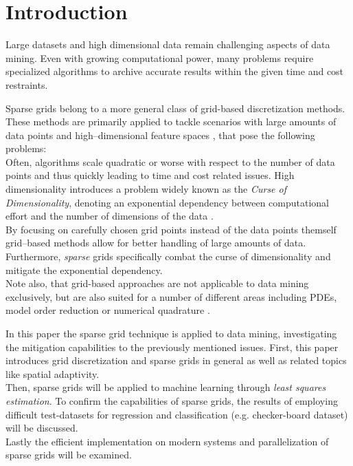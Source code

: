 \section{Introduction}
Large datasets and high dimensional data remain challenging aspects of data
mining. Even with growing computational power, many problems require
specialized algorithms to archive accurate results within the given time and
cost restraints.

\par

Sparse grids belong to a more general class of grid-based
discretization methods. These methods are primarily applied to
tackle scenarios with large amounts of data points and high--dimensional
feature spaces \cite{artbunshort}, that pose the following problems:
\\
Often, algorithms scale quadratic or worse with respect to the number of data points and
thus quickly leading to time and cost related issues.
High dimensionality introduces a problem widely known as the \emph{Curse of
Dimensionality}, denoting an exponential dependency between computational
effort and the number of dimensions of the data \cite{artbunshort, disspfl}. \\
By focusing on carefully chosen grid points instead
of the data points themself grid--based methods allow for better handling of large amounts of data. 
Furthermore, \emph{sparse} grids specifically combat the curse of 
dimensionality and mitigate the exponential dependency. \\
Note also, that grid-based approaches are not applicable to data mining
exclusively, but are also
suited for a number of different areas including PDEs, model order
reduction \cite{disspeh} or numerical quadrature \cite{artbunlong}.

\par

In this paper the sparse grid technique is applied to data mining,
investigating the mitigation capabilities to the previously mentioned issues.
First, this paper introduces grid discretization and sparse grids in
general as well as related topics like spatial adaptivity. \\
Then, sparse grids will be applied to machine learning
through \emph{least squares estimation}. To confirm the capabilities
of sparse grids, the results of employing difficult
test-datasets for regression and classification (e.g.
checker-board dataset) will be discussed. \\
Lastly the efficient implementation on modern systems and parallelization of
sparse grids will be examined.

